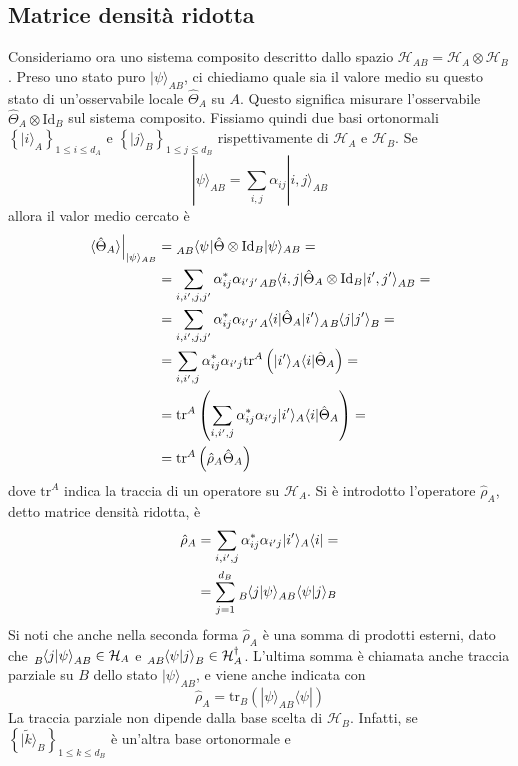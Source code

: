 \documentclass[a4paper, 11pt]{article}
\renewcommand{\H}{\mathcal{H}}
\newcommand{\id}{\mathrm{Id}}
\newcommand{\tr}{\mathrm{tr}}
\renewcommand{\ket}[1]{| #1\rangle}
\renewcommand{\bra}[1]{\langle #1|}
\begin{document}
\subsection{Matrice densità ridotta}
Consideriamo ora uno sistema composito descritto dallo spazio $\H_{AB}=\H_A\otimes\H_B$. Preso uno stato puro $\ket{\psi}_{AB}$, ci chiediamo quale sia il valore medio su questo stato di un'osservabile locale $\hat{\Theta}_A$ su $A$. Questo significa misurare l'osservabile $\hat{\Theta}_A\otimes\id_B$ sul sistema composito. Fissiamo quindi due basi ortonormali $\left\{\ket{i}_A\right\}_{1\leq i\leq d_A}$ e $\left\{\ket{j}_B\right\}_{1\leq j\leq d_B}$ rispettivamente di $\H_A$ e $\H_B$. Se
\[\ket{\psi}_{AB}=\sum_{i,j}\alpha_{ij}\ket{i,j}_{AB}\]
allora il valor medio cercato è
\begin{align*}
	\left.\langle\hat{\Theta}_A\rangle\right|_{\ket{\psi}_{AB}}&=\tensor*[_{AB}]{\langle\psi}{}|\hat{\Theta}\otimes\id_B\ket{\psi}_{AB}=\\&=\sum_{i,i',j,j'}\alpha^*_{ij}\alpha_{i'j'}\tensor*[_{AB}]{\braketop{i,j}{\hat{\Theta}_A\otimes\id_B}{i',j'}}{_{AB}}=\\&=\sum_{i,i',j,j'}\alpha^*_{ij}\alpha_{i'j'}\tensor*[_A]{\braketop{i}{\hat{\Theta}_A}{i'}}{_A}\tensor*[_B]{\braket{j}{j'}}{_B}=\\&=\sum_{i,i',j}\alpha^*_{ij}\alpha_{i'j}\tr^A\left(\ket{i'}_A\bra{i}\hat{\Theta}_A\right)=\\&=\tr^A\left(\sum_{i,i',j}\alpha^*_{ij}\alpha_{i'j}\ket{i'}_A\bra{i}\hat{\Theta}_A\right)=\\&=\tr^A\left(\hat{\rho}_A\hat{\Theta}_A\right)
\end{align*}
dove $\tr^A$ indica la traccia di un operatore su $\H_A$. Si è introdotto l'operatore $\hat{\rho}_A$, detto matrice densità ridotta, è
\begin{align*}\hat{\rho}_A&=\sum_{i,i',j}\alpha^*_{ij}\alpha_{i'j}\ket{i'}_A\bra{i}=\\&=\sum_{j=1}^{d_B}\tensor*[_B]{\braket{j}{\psi}}{_{AB}}\braket{\psi}{j}_B\end{align*}
Si noti che anche nella seconda forma $\hat{\rho}_A$ è una somma di prodotti esterni, dato che $\tensor*[_B]{\braket{j}{\psi}}{_{AB}}\in\H_A$ e $\tensor*[_{AB}]{\braket{\psi}{j}}{_{B}}\in\H^\dagger_A$. L'ultima somma è chiamata anche traccia parziale su $B$ dello stato $\ket{\psi}_{AB}$, e viene anche indicata con
\[\hat{\rho}_A=\tr_B\left(\ket{\psi}_{AB}\bra{\psi}\right)\]
La traccia parziale non dipende dalla base scelta di $\H_B$. Infatti, se $\left\{|{\tilde{k}}\rangle_B\right\}_{1\leq k\leq d_B}$ è un'altra base ortonormale e
\end{document}

